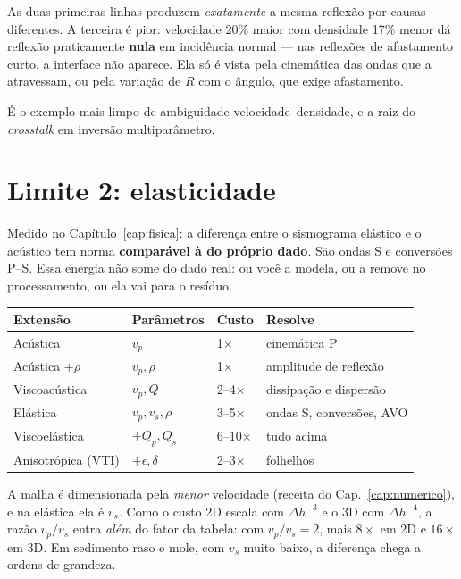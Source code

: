 \documentclass[11pt,a4paper,oneside]{report}
\begin{document}
As duas primeiras linhas produzem \emph{exatamente} a mesma reflex\~ao por
causas diferentes. A terceira \'e pior: velocidade 20\% maior com densidade
17\% menor d\'a reflex\~ao praticamente \textbf{nula} em incid\^encia normal ---
nas reflex\~oes de afastamento curto, a interface n\~ao aparece. Ela s\'o \'e
vista pela cinem\'atica das ondas que a atravessam, ou pela varia\c{c}\~ao de
$R$ com o \^angulo, que exige afastamento.

\'E o exemplo mais limpo de ambiguidade velocidade--densidade, e a raiz do
\emph{crosstalk} em invers\~ao multipar\^ametro.


\section{Limite 2: elasticidade}

Medido no Cap\'itulo~\ref{cap:fisica}: a diferen\c{c}a entre o sismograma
el\'astico e o ac\'ustico tem norma \textbf{compar\'avel \`a do pr\'oprio
dado}. S\~ao ondas S e convers\~oes P--S. Essa energia n\~ao some do dado
real: ou voc\^e a modela, ou a remove no processamento, ou ela vai para o
res\'iduo.

\begin{center}
\begin{tabular}{@{}llll@{}}
\toprule
\textbf{Extens\~ao} & \textbf{Par\^ametros} & \textbf{Custo} & \textbf{Resolve} \\
\midrule
Ac\'ustica & $v_p$ & 1$\times$ & cinem\'atica P \\
Ac\'ustica $+\rho$ & $v_p,\rho$ & 1$\times$ & amplitude de reflex\~ao \\
Viscoac\'ustica & $v_p,Q$ & 2--4$\times$ & dissipa\c{c}\~ao e dispers\~ao \\
El\'astica & $v_p,v_s,\rho$ & 3--5$\times$ & ondas S, convers\~oes, AVO \\
Viscoel\'astica & $+Q_p,Q_s$ & 6--10$\times$ & tudo acima \\
Anisotr\'opica (VTI) & $+\epsilon,\delta$ & 2--3$\times$ & folhelhos \\
\bottomrule
\end{tabular}
\end{center}

\begin{atencao}
A malha \'e dimensionada pela \emph{menor} velocidade (receita do
Cap.~\ref{cap:numerico}), e na el\'astica ela \'e $v_s$. Como o
custo 2D escala com $\Delta h^{-3}$ e o 3D com $\Delta h^{-4}$, a raz\~ao
$v_p/v_s$ entra \emph{al\'em} do fator da tabela: com $v_p/v_s = 2$, mais
$8\times$ em 2D e $16\times$ em 3D. Em sedimento raso e mole, com $v_s$ muito
baixo, a diferen\c{c}a chega a ordens de grandeza.
\end{atencao}
\end{document}
